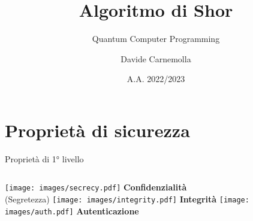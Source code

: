 \documentclass{beamer}
\title{Algoritmo di Shor}
\subtitle{Quantum Computer Programming}
\author{Davide Carnemolla}
\institute{Dipartimento di Matematica e Informatica \\ Università degli Studi di Catania}
\date{A.A. 2022/2023}
\begin{document}
    \begin{frame}
        \maketitle
    \end{frame}
    
    \section{Proprietà di sicurezza}
    \begin{frame}{Proprietà di 1° livello }
        \begin{columns}[t, onlytextwidth]
                \centering
                \texttt{[image: images/secrecy.pdf]}
                \vfill
                \textbf{Confidenzialità} \\ (Segretezza)
                \centering
                \texttt{[image: images/integrity.pdf]}
                \vfill
                \textbf{Integrità}
                \centering
                \texttt{[image: images/auth.pdf]}
                \vfill
                \textbf{Autenticazione}
        \end{columns}
    \end{frame}
    
    
\end{document}
